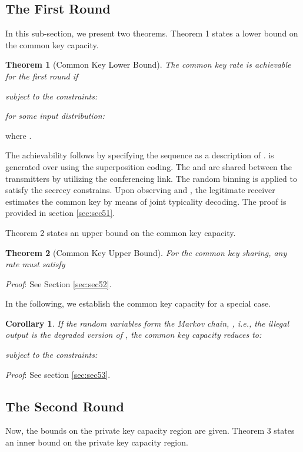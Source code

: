 \documentclass[conference,8pt]{IEEEtran}
\newtheorem{th1}{Theorem}
\newtheorem{corollary}{Corollary}
\begin{document}
{{\subsection{The First Round}\label{sec:sec31}{
In this sub-section, we present two theorems. Theorem 1 states a lower bound on the common key capacity.

\begin{th1}[Common Key Lower Bound]
The common key rate  is achievable for the first round if 

subject to the constraints:

for some input distribution:

\end{th1}where .

\begin{IEEEproof}The achievability follows by specifying the sequence  as a description of .  is generated over  using the superposition coding. The  and  are shared between the transmitters by utilizing the conferencing link. The random binning is applied to satisfy the secrecy constrains. Upon observing  and , the legitimate receiver estimates the common key by means of joint typicality decoding. The proof is provided in section \ref{sec:sec51}. 
\end{IEEEproof}Theorem 2 states an upper bound on the common key capacity.

\begin{th1}[Common Key Upper Bound]
For the common key sharing, any rate  must satisfy

\end{th1}
\emph{Proof}: See Section \ref{sec:sec52}.

In the following, we establish the common key capacity for a special case.

\begin{corollary}
If the random variables  form the Markov chain,     , i.e., the illegal output  is the degraded version of , the common key capacity reduces to:

subject to the constraints:

\end{corollary}
\emph{Proof}: See section \ref{sec:sec53}.

\subsection{The Second Round}\label{sec:sec32}{
Now, the bounds on the private key capacity region are given. Theorem 3 states an inner bound on the private key capacity region. 

}}}}
\end{document}
